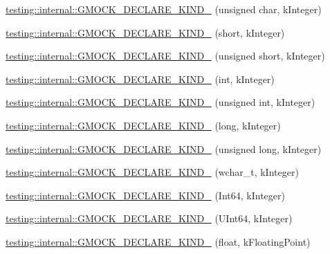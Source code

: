 \begin{DoxyCompactItemize}
\item 
\mbox{\hyperlink{namespacetesting_1_1internal_ab13e89be2f0f22b1da9e22cd53bce5ce}{testing\+::internal\+::\+G\+M\+O\+C\+K\+\_\+\+D\+E\+C\+L\+A\+R\+E\+\_\+\+K\+I\+N\+D\+\_\+}} (unsigned char, k\+Integer)
\item 
\mbox{\hyperlink{namespacetesting_1_1internal_af191a2be9cff1d5900426ef5aa59851e}{testing\+::internal\+::\+G\+M\+O\+C\+K\+\_\+\+D\+E\+C\+L\+A\+R\+E\+\_\+\+K\+I\+N\+D\+\_\+}} (short, k\+Integer)
\item 
\mbox{\hyperlink{namespacetesting_1_1internal_a6138ee5ce9f509d39e874e4eedb89ae1}{testing\+::internal\+::\+G\+M\+O\+C\+K\+\_\+\+D\+E\+C\+L\+A\+R\+E\+\_\+\+K\+I\+N\+D\+\_\+}} (unsigned short, k\+Integer)
\item 
\mbox{\hyperlink{namespacetesting_1_1internal_a59fb8e3bb6f1fec656ed8bdab0048f9f}{testing\+::internal\+::\+G\+M\+O\+C\+K\+\_\+\+D\+E\+C\+L\+A\+R\+E\+\_\+\+K\+I\+N\+D\+\_\+}} (int, k\+Integer)
\item 
\mbox{\hyperlink{namespacetesting_1_1internal_abdce95ddf8b975d2a17e76a4c5a6c37f}{testing\+::internal\+::\+G\+M\+O\+C\+K\+\_\+\+D\+E\+C\+L\+A\+R\+E\+\_\+\+K\+I\+N\+D\+\_\+}} (unsigned int, k\+Integer)
\item 
\mbox{\hyperlink{namespacetesting_1_1internal_a40597f856b3d94dc82e9fbbf9b027819}{testing\+::internal\+::\+G\+M\+O\+C\+K\+\_\+\+D\+E\+C\+L\+A\+R\+E\+\_\+\+K\+I\+N\+D\+\_\+}} (long, k\+Integer)
\item 
\mbox{\hyperlink{namespacetesting_1_1internal_a8224329431c90b3d943cc43ac92e6e42}{testing\+::internal\+::\+G\+M\+O\+C\+K\+\_\+\+D\+E\+C\+L\+A\+R\+E\+\_\+\+K\+I\+N\+D\+\_\+}} (unsigned long, k\+Integer)
\item 
\mbox{\hyperlink{namespacetesting_1_1internal_af00aa2679c10ed170064e5ec5dd80e29}{testing\+::internal\+::\+G\+M\+O\+C\+K\+\_\+\+D\+E\+C\+L\+A\+R\+E\+\_\+\+K\+I\+N\+D\+\_\+}} (wchar\+\_\+t, k\+Integer)
\item 
\mbox{\hyperlink{namespacetesting_1_1internal_ae1d4cd9aef9a240d257364691ed3679e}{testing\+::internal\+::\+G\+M\+O\+C\+K\+\_\+\+D\+E\+C\+L\+A\+R\+E\+\_\+\+K\+I\+N\+D\+\_\+}} (Int64, k\+Integer)
\item 
\mbox{\hyperlink{namespacetesting_1_1internal_ae09394c3d07a5d99308fc3bbc9edc877}{testing\+::internal\+::\+G\+M\+O\+C\+K\+\_\+\+D\+E\+C\+L\+A\+R\+E\+\_\+\+K\+I\+N\+D\+\_\+}} (U\+Int64, k\+Integer)
\item 
\mbox{\hyperlink{namespacetesting_1_1internal_ad4ebf1b53b79ac38fbd18ccf4d63ceca}{testing\+::internal\+::\+G\+M\+O\+C\+K\+\_\+\+D\+E\+C\+L\+A\+R\+E\+\_\+\+K\+I\+N\+D\+\_\+}} (float, k\+Floating\+Point)

\end{DoxyCompactItemize}
